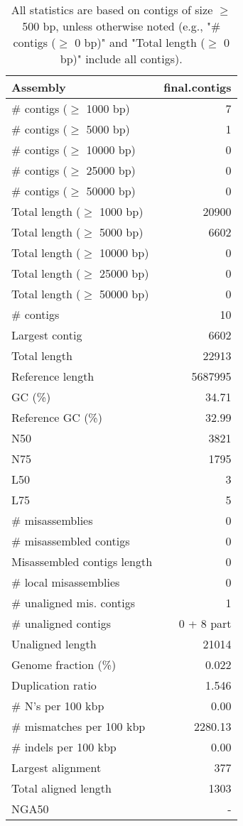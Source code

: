 \documentclass[12pt,a4paper]{article}
\begin{document}
\begin{table}[ht]
\begin{center}
\caption{All statistics are based on contigs of size $\geq$ 500 bp, unless otherwise noted (e.g., "\# contigs ($\geq$ 0 bp)" and "Total length ($\geq$ 0 bp)" include all contigs).}
\begin{tabular}{|l*{1}{|r}|}
\hline
Assembly & final.contigs \\ \hline
\# contigs ($\geq$ 1000 bp) & 7 \\ \hline
\# contigs ($\geq$ 5000 bp) & 1 \\ \hline
\# contigs ($\geq$ 10000 bp) & 0 \\ \hline
\# contigs ($\geq$ 25000 bp) & 0 \\ \hline
\# contigs ($\geq$ 50000 bp) & 0 \\ \hline
Total length ($\geq$ 1000 bp) & 20900 \\ \hline
Total length ($\geq$ 5000 bp) & 6602 \\ \hline
Total length ($\geq$ 10000 bp) & 0 \\ \hline
Total length ($\geq$ 25000 bp) & 0 \\ \hline
Total length ($\geq$ 50000 bp) & 0 \\ \hline
\# contigs & 10 \\ \hline
Largest contig & 6602 \\ \hline
Total length & 22913 \\ \hline
Reference length & 5687995 \\ \hline
GC (\%) & 34.71 \\ \hline
Reference GC (\%) & 32.99 \\ \hline
N50 & 3821 \\ \hline
N75 & 1795 \\ \hline
L50 & 3 \\ \hline
L75 & 5 \\ \hline
\# misassemblies & 0 \\ \hline
\# misassembled contigs & 0 \\ \hline
Misassembled contigs length & 0 \\ \hline
\# local misassemblies & 0 \\ \hline
\# unaligned mis. contigs & 1 \\ \hline
\# unaligned contigs & 0 + 8 part \\ \hline
Unaligned length & 21014 \\ \hline
Genome fraction (\%) & 0.022 \\ \hline
Duplication ratio & 1.546 \\ \hline
\# N's per 100 kbp & 0.00 \\ \hline
\# mismatches per 100 kbp & 2280.13 \\ \hline
\# indels per 100 kbp & 0.00 \\ \hline
Largest alignment & 377 \\ \hline
Total aligned length & 1303 \\ \hline
NGA50 & - \\ \hline
\end{tabular}
\end{center}
\end{table}
\end{document}
